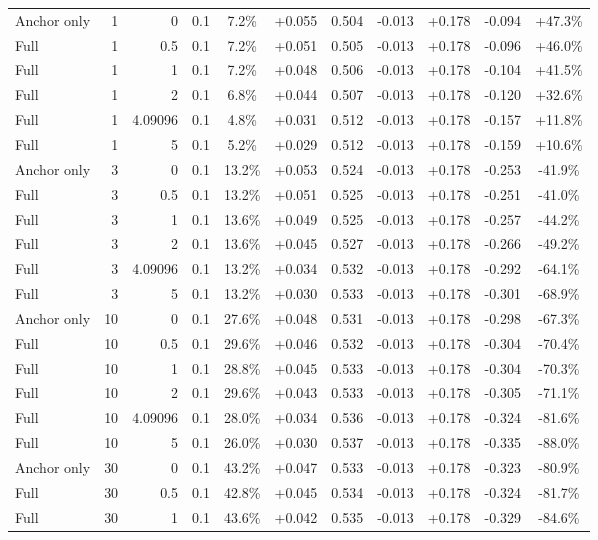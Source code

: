 \begin{table}[htbp]
\begin{tabular}{lrrrccccccc}
Anchor only & 1 & 0 & 0.1 & 7.2\% & +0.055 & 0.504 & -0.013 & +0.178 & -0.094 & +47.3\% \\
Full & 1 & 0.5 & 0.1 & 7.2\% & +0.051 & 0.505 & -0.013 & +0.178 & -0.096 & +46.0\% \\
Full & 1 & 1 & 0.1 & 7.2\% & +0.048 & 0.506 & -0.013 & +0.178 & -0.104 & +41.5\% \\
Full & 1 & 2 & 0.1 & 6.8\% & +0.044 & 0.507 & -0.013 & +0.178 & -0.120 & +32.6\% \\
Full & 1 & 4.09096 & 0.1 & 4.8\% & +0.031 & 0.512 & -0.013 & +0.178 & -0.157 & +11.8\% \\
Full & 1 & 5 & 0.1 & 5.2\% & +0.029 & 0.512 & -0.013 & +0.178 & -0.159 & +10.6\% \\
Anchor only & 3 & 0 & 0.1 & 13.2\% & +0.053 & 0.524 & -0.013 & +0.178 & -0.253 & -41.9\% \\
Full & 3 & 0.5 & 0.1 & 13.2\% & +0.051 & 0.525 & -0.013 & +0.178 & -0.251 & -41.0\% \\
Full & 3 & 1 & 0.1 & 13.6\% & +0.049 & 0.525 & -0.013 & +0.178 & -0.257 & -44.2\% \\
Full & 3 & 2 & 0.1 & 13.6\% & +0.045 & 0.527 & -0.013 & +0.178 & -0.266 & -49.2\% \\
Full & 3 & 4.09096 & 0.1 & 13.2\% & +0.034 & 0.532 & -0.013 & +0.178 & -0.292 & -64.1\% \\
Full & 3 & 5 & 0.1 & 13.2\% & +0.030 & 0.533 & -0.013 & +0.178 & -0.301 & -68.9\% \\
Anchor only & 10 & 0 & 0.1 & 27.6\% & +0.048 & 0.531 & -0.013 & +0.178 & -0.298 & -67.3\% \\
Full & 10 & 0.5 & 0.1 & 29.6\% & +0.046 & 0.532 & -0.013 & +0.178 & -0.304 & -70.4\% \\
Full & 10 & 1 & 0.1 & 28.8\% & +0.045 & 0.533 & -0.013 & +0.178 & -0.304 & -70.3\% \\
Full & 10 & 2 & 0.1 & 29.6\% & +0.043 & 0.533 & -0.013 & +0.178 & -0.305 & -71.1\% \\
Full & 10 & 4.09096 & 0.1 & 28.0\% & +0.034 & 0.536 & -0.013 & +0.178 & -0.324 & -81.6\% \\
Full & 10 & 5 & 0.1 & 26.0\% & +0.030 & 0.537 & -0.013 & +0.178 & -0.335 & -88.0\% \\
Anchor only & 30 & 0 & 0.1 & 43.2\% & +0.047 & 0.533 & -0.013 & +0.178 & -0.323 & -80.9\% \\
Full & 30 & 0.5 & 0.1 & 42.8\% & +0.045 & 0.534 & -0.013 & +0.178 & -0.324 & -81.7\% \\
Full & 30 & 1 & 0.1 & 43.6\% & +0.042 & 0.535 & -0.013 & +0.178 & -0.329 & -84.6\% \\

\end{tabular}
\end{table}
